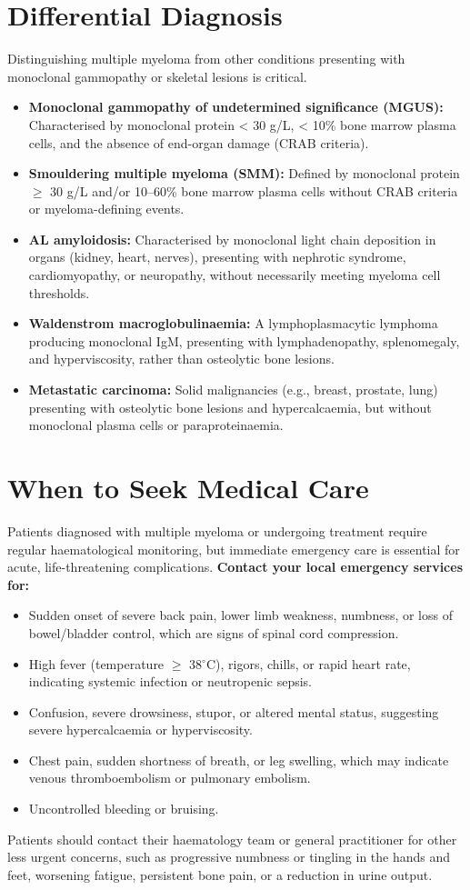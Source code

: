 \section*{Differential Diagnosis}
Distinguishing multiple myeloma from other conditions presenting with monoclonal gammopathy or skeletal lesions is critical.
\begin{itemize}
    \item \textbf{Monoclonal gammopathy of undetermined significance (MGUS):} Characterised by monoclonal protein < 30 g/L, < 10\% bone marrow plasma cells, and the absence of end-organ damage (CRAB criteria).
    \item \textbf{Smouldering multiple myeloma (SMM):} Defined by monoclonal protein $\ge$ 30 g/L and/or 10--60\% bone marrow plasma cells without CRAB criteria or myeloma-defining events.
    \item \textbf{AL amyloidosis:} Characterised by monoclonal light chain deposition in organs (kidney, heart, nerves), presenting with nephrotic syndrome, cardiomyopathy, or neuropathy, without necessarily meeting myeloma cell thresholds.
    \item \textbf{Waldenstrom macroglobulinaemia:} A lymphoplasmacytic lymphoma producing monoclonal IgM, presenting with lymphadenopathy, splenomegaly, and hyperviscosity, rather than osteolytic bone lesions.
    \item \textbf{Metastatic carcinoma:} Solid malignancies (e.g., breast, prostate, lung) presenting with osteolytic bone lesions and hypercalcaemia, but without monoclonal plasma cells or paraproteinaemia.
\end{itemize}

\section*{When to Seek Medical Care}
Patients diagnosed with multiple myeloma or undergoing treatment require regular haematological monitoring, but immediate emergency care is essential for acute, life-threatening complications.
\textbf{Contact your local emergency services for:}
\begin{itemize}
    \item Sudden onset of severe back pain, lower limb weakness, numbness, or loss of bowel/bladder control, which are signs of spinal cord compression.
    \item High fever (temperature $\ge$ 38$^\circ$C), rigors, chills, or rapid heart rate, indicating systemic infection or neutropenic sepsis.
    \item Confusion, severe drowsiness, stupor, or altered mental status, suggesting severe hypercalcaemia or hyperviscosity.
    \item Chest pain, sudden shortness of breath, or leg swelling, which may indicate venous thromboembolism or pulmonary embolism.
    \item Uncontrolled bleeding or bruising.
\end{itemize}
Patients should contact their haematology team or general practitioner for other less urgent concerns, such as progressive numbness or tingling in the hands and feet, worsening fatigue, persistent bone pain, or a reduction in urine output.

